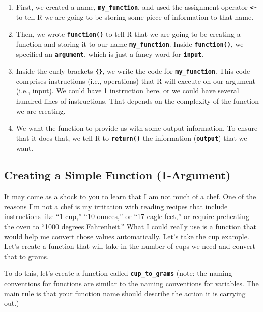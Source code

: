 \documentclass[
]{book}
\begin{document}
\begin{enumerate}
\def\labelenumi{\arabic{enumi}.}
\item
  First, we created a name, \textbf{\texttt{my\_function}}, and used the assignment operator \textbf{\texttt{\textless{}-}} to tell R we are going to be storing some piece of information to that name.
\item
  Then, we wrote \textbf{\texttt{function()}} to tell R that we are going to be creating a function and storing it to our name \textbf{\texttt{my\_function}}. Inside \textbf{\texttt{function()}}, we specified an \textbf{\texttt{argument}}, which is just a fancy word for \textbf{\texttt{input}}.
\item
  Inside the curly brackets \textbf{\texttt{\{\}}}, we write the code for \textbf{\texttt{my\_function}}. This code comprises instructions (i.e., operations) that R will execute on our argument (i.e., input). We could have 1 instruction here, or we could have several hundred lines of instructions. That depends on the complexity of the function we are creating.
\item
  We want the function to provide us with some output information. To ensure that it does that, we tell R to \textbf{\texttt{return()}} the information (\textbf{\texttt{output}}) that we want.
\end{enumerate}

\hypertarget{creating-a-simple-function-1-argument}{%
\subsection{Creating a Simple Function (1-Argument)}\label{creating-a-simple-function-1-argument}}

It may come as a shock to you to learn that I am not much of a chef. One of the reasons I'm not a chef is my irritation with reading recipes that include instructions like ``1 cup,'' ``10 ounces,'' or ``17 eagle feet,'' or require preheating the oven to ``1000 degrees Fahrenheit.'' What I could really use is a function that would help me convert those values automatically. Let's take the cup example. Let's create a function that will take in the number of cups we need and convert that to grams.

To do this, let's create a function called \textbf{\texttt{cup\_to\_grams}} (note: the naming conventions for functions are similar to the naming conventions for variables. The main rule is that your function name should describe the action it is carrying out.)
\end{document}
